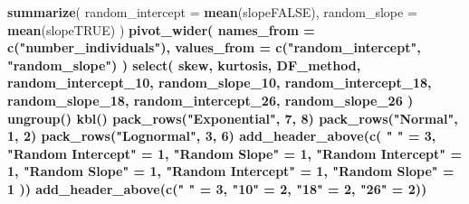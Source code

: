 \documentclass[12pt, twoside]{amherstthesis}
\newenvironment{Shaded}{\begin{snugshade}}{\end{snugshade}}
\newcommand{\DataTypeTok}[1]{\textcolor[rgb]{0.13,0.29,0.53}{#1}}
\newcommand{\DecValTok}[1]{\textcolor[rgb]{0.00,0.00,0.81}{#1}}
\newcommand{\KeywordTok}[1]{\textcolor[rgb]{0.13,0.29,0.53}{\textbf{#1}}}
\newcommand{\NormalTok}[1]{#1}
\newcommand{\OperatorTok}[1]{\textcolor[rgb]{0.81,0.36,0.00}{\textbf{#1}}}
\newcommand{\StringTok}[1]{\textcolor[rgb]{0.31,0.60,0.02}{#1}}
\begin{document}
\begin{Shaded}
\begin{Highlighting}[]
{{{{{{{{{{{{{{{{{{{{{{{{{{{{{{{{{{{{{{{{{{{{{{{{{{{{{{{\StringTok{  }\KeywordTok{summarize}\NormalTok{(}
    \DataTypeTok{random_intercept =} \KeywordTok{mean}\NormalTok{(slopeFALSE),}
    \DataTypeTok{random_slope =} \KeywordTok{mean}\NormalTok{(slopeTRUE)}
\NormalTok{  ) }\OperatorTok{%>%}
\StringTok{  }\KeywordTok{pivot_wider}\NormalTok{(}
    \DataTypeTok{names_from =} \KeywordTok{c}\NormalTok{(}\StringTok{"number_individuals"}\NormalTok{),}
    \DataTypeTok{values_from =} \KeywordTok{c}\NormalTok{(}\StringTok{"random_intercept"}\NormalTok{, }\StringTok{"random_slope"}\NormalTok{)}
\NormalTok{  ) }\OperatorTok{%>%}
\StringTok{  }\KeywordTok{select}\NormalTok{(}
\NormalTok{    skew, kurtosis, DF_method, random_intercept_}\DecValTok{10}\NormalTok{, random_slope_}\DecValTok{10}\NormalTok{, }
\NormalTok{    random_intercept_}\DecValTok{18}\NormalTok{,}
\NormalTok{    random_slope_}\DecValTok{18}\NormalTok{, random_intercept_}\DecValTok{26}\NormalTok{, random_slope_}\DecValTok{26}
\NormalTok{  ) }\OperatorTok{%>%}
\StringTok{  }\KeywordTok{ungroup}\NormalTok{() }\OperatorTok{%>%}
\StringTok{  }\KeywordTok{kbl}\NormalTok{() }\OperatorTok{%>%}
\StringTok{  }\KeywordTok{pack_rows}\NormalTok{(}\StringTok{"Exponential"}\NormalTok{, }\DecValTok{7}\NormalTok{, }\DecValTok{8}\NormalTok{) }\OperatorTok{%>%}
\StringTok{  }\KeywordTok{pack_rows}\NormalTok{(}\StringTok{"Normal"}\NormalTok{, }\DecValTok{1}\NormalTok{, }\DecValTok{2}\NormalTok{) }\OperatorTok{%>%}
\StringTok{  }\KeywordTok{pack_rows}\NormalTok{(}\StringTok{"Lognormal"}\NormalTok{, }\DecValTok{3}\NormalTok{, }\DecValTok{6}\NormalTok{) }\OperatorTok{%>%}
\StringTok{  }\KeywordTok{add_header_above}\NormalTok{(}\KeywordTok{c}\NormalTok{(}
    \StringTok{" "}\NormalTok{ =}\StringTok{ }\DecValTok{3}\NormalTok{, }\StringTok{"Random Intercept"}\NormalTok{ =}\StringTok{ }\DecValTok{1}\NormalTok{, }\StringTok{"Random Slope"}\NormalTok{ =}\StringTok{ }\DecValTok{1}\NormalTok{, }
    \StringTok{"Random Intercept"}\NormalTok{ =}\StringTok{ }\DecValTok{1}\NormalTok{,}
    \StringTok{"Random Slope"}\NormalTok{ =}\StringTok{ }\DecValTok{1}\NormalTok{, }\StringTok{"Random Intercept"}\NormalTok{ =}\StringTok{ }\DecValTok{1}\NormalTok{, }\StringTok{"Random Slope"}\NormalTok{ =}\StringTok{ }\DecValTok{1}
\NormalTok{  )) }\OperatorTok{%>%}
\StringTok{  }\KeywordTok{add_header_above}\NormalTok{(}\KeywordTok{c}\NormalTok{(}\StringTok{" "}\NormalTok{ =}\StringTok{ }\DecValTok{3}\NormalTok{, }\StringTok{"10"}\NormalTok{ =}\StringTok{ }\DecValTok{2}\NormalTok{, }\StringTok{"18"}\NormalTok{ =}\StringTok{ }\DecValTok{2}\NormalTok{, }\StringTok{"26"}\NormalTok{ =}\StringTok{ }\DecValTok{2}\NormalTok{)) }\OperatorTok{%>%}
}}}}}}}}}}}}}}}}}}}}}}}}}}}}}}}}}}}}}}}}}}}}}}}}}}}}}}}}}}}}}}}}}
\end{Highlighting}
\end{Shaded}
\end{document}
